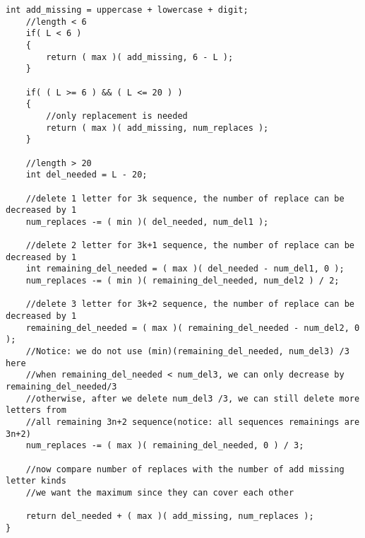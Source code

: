 \begin{lstlisting}[style=customc, caption={Change to $3\times n+2$ sequence}]
    int add_missing = uppercase + lowercase + digit;
    //length < 6
    if( L < 6 )
    {
        return ( max )( add_missing, 6 - L );
    }

    if( ( L >= 6 ) && ( L <= 20 ) )
    {
        //only replacement is needed
        return ( max )( add_missing, num_replaces );
    }

    //length > 20
    int del_needed = L - 20;

    //delete 1 letter for 3k sequence, the number of replace can be decreased by 1
    num_replaces -= ( min )( del_needed, num_del1 );

    //delete 2 letter for 3k+1 sequence, the number of replace can be decreased by 1
    int remaining_del_needed = ( max )( del_needed - num_del1, 0 );
    num_replaces -= ( min )( remaining_del_needed, num_del2 ) / 2;

    //delete 3 letter for 3k+2 sequence, the number of replace can be decreased by 1
    remaining_del_needed = ( max )( remaining_del_needed - num_del2, 0 );
    //Notice: we do not use (min)(remaining_del_needed, num_del3) /3 here
    //when remaining_del_needed < num_del3, we can only decrease by remaining_del_needed/3
    //otherwise, after we delete num_del3 /3, we can still delete more letters from
    //all remaining 3n+2 sequence(notice: all sequences remainings are 3n+2)
    num_replaces -= ( max )( remaining_del_needed, 0 ) / 3;

    //now compare number of replaces with the number of add missing letter kinds
    //we want the maximum since they can cover each other

    return del_needed + ( max )( add_missing, num_replaces );
}

\end{lstlisting}

